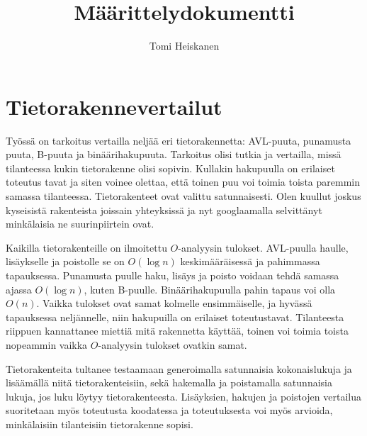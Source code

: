 \documentclass[12pt, leqno, a4paper]{article}
\begin{document}
\title{Määrittelydokumentti}
\author{Tomi Heiskanen}

\thispagestyle{empty}
\maketitle

\section*{Tietorakennevertailut}

Työssä on tarkoitus vertailla neljää eri tietorakennetta: AVL-puuta, punamusta
puuta, B-puuta ja binäärihakupuuta. Tarkoitus olisi tutkia ja vertailla, missä 
tilanteessa kukin tietorakenne olisi sopivin. Kullakin hakupuulla on erilaiset toteutus
tavat ja siten voinee olettaa, että toinen puu voi toimia toista paremmin
samassa tilanteessa. Tietorakenteet ovat valittu satunnaisesti. Olen kuullut
joskus kyseisistä rakenteista joissain yhteyksissä ja nyt googlaamalla selvittänyt
minkälaisia ne suurinpiirtein ovat.

Kaikilla tietorakenteille on ilmoitettu $O$-analyysin tulokset. AVL-puulla haulle,
lisäykselle ja poistolle se on $O(\log n)$ keskimääräisessä ja pahimmassa
tapauksessa. Punamusta puulle haku, lisäys ja poisto voidaan tehdä samassa
ajassa $O(\log n)$, kuten B-puulle. Binäärihakupuulla pahin tapaus voi olla
$O(n)$. Vaikka tulokset ovat samat kolmelle ensimmäiselle, ja hyvässä tapauksessa
neljännelle, niin hakupuilla on erilaiset toteutustavat. Tilanteesta riippuen 
kannattanee miettiä mitä rakennetta käyttää, toinen voi toimia toista nopeammin 
vaikka $O$-analyysin tulokset ovatkin samat.

Tietorakenteita tultanee testaamaan generoimalla satunnaisia kokonaislukuja ja
lisäämällä niitä tietorakenteisiin, sekä hakemalla ja poistamalla satunnaisia
lukuja, jos luku löytyy tietorakenteesta. Lisäyksien, hakujen ja poistojen vertailua
suoritetaan myös toteutusta koodatessa ja toteutuksesta voi myös arvioida,
minkälaisiin tilanteisiin tietorakenne sopisi.

\nocite{AVL}
\nocite{PM}
\nocite{Bin}
\nocite{B-puu}
\renewcommand{\refname}{Lähteet}


\end{document}
